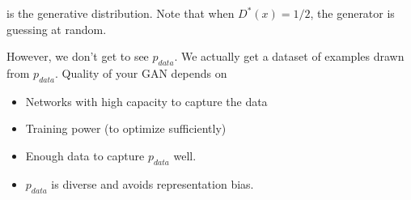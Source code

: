 \documentclass[titlepage, 12pt, leqno]{article}
\begin{document}
is the generative distribution. Note that when $D^{*}(x) = 1/2$, the generator is
guessing at random.

However, we don't get to see $p_{data}$. We actually get a dataset of examples
drawn from $p_{data}$. Quality of your GAN depends on
\begin{itemize}
    \item Networks with high capacity to capture the data
    \item Training power (to optimize sufficiently)
    \item Enough data to capture $p_{data}$ well.
    \item $p_{data}$ is diverse and avoids representation bias.
\end{itemize}
\end{document}
